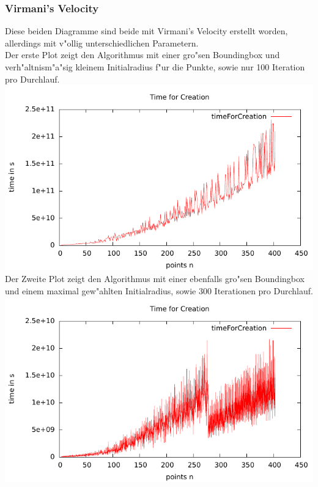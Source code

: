     \subsubsection{Virmani's Velocity}
      Diese beiden Diagramme sind beide mit Virmani's Velocity erstellt worden,
      allerdings mit v"ollig unterschiedlichen Parametern.\\
      Der erste Plot zeigt den Algorithmus mit einer gro"sen Boundingbox 
      und verh"altnism"a"sig kleinem Initialradius f"ur die Punkte, sowie 
      nur 100 Iteration pro Durchlauf.\\
      \includegraphics{img/velo_good_diagram_0.pdf}\\
      Der Zweite Plot zeigt den Algorithmus mit einer ebenfalls gro"sen 
      Boundingbox und einem maximal gew"ahlten Initialradius, sowie 300 Iterationen
      pro Durchlauf.\\
      \includegraphics{img/velo_bad_diagram_0.pdf}
